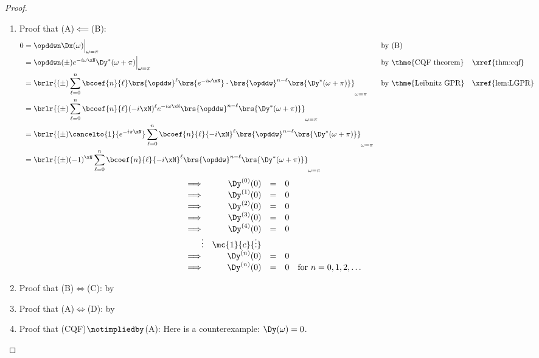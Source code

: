 \begin{proof}
\begin{enumerate}
  \item Proof that (A)$\impliedby$(B): 
    \begin{align*}
      0
        &= \opddwn\Dx(\omega)\Big|_{\omega=\pi}
        && \text{by (B)}
      \\&= \opddwn(\pm) e^{-i\omega\xN} \Dy^\ast(\omega+\pi)\Big|_{\omega=\pi}
        && \text{by \thme{CQF theorem}}
        && \text{\xref{thm:cqf}}
      \\&= \brlr{(\pm) \sum_{\ell=0}^n \bcoef{n}{\ell} \brs{\opddw}^\ell\brs{e^{-i\omega\xN}}\cdot\brs{\opddw}^{n-\ell}\brs{\Dy^\ast(\omega+\pi)}}_{\omega=\pi}
        && \text{by \thme{Leibnitz GPR}}
        && \text{\xref{lem:LGPR}}
      \\&= \brlr{(\pm) \sum_{\ell=0}^n \bcoef{n}{\ell} (-i\xN)^\ell e^{-i\omega\xN}\brs{\opddw}^{n-\ell}\brs{\Dy^\ast(\omega+\pi)}}_{\omega=\pi}
      \\&= \brlr{(\pm) \cancelto{1}{e^{-i\pi\xN}} \sum_{\ell=0}^n \bcoef{n}{\ell} {-i\xN}^\ell \brs{\opddw}^{n-\ell}\brs{\Dy^\ast(\omega+\pi)}}_{\omega=\pi}
      \\&= \brlr{(\pm) (-1)^\xN \sum_{\ell=0}^n \bcoef{n}{\ell} {-i\xN}^\ell \brs{\opddw}^{n-\ell}\brs{\Dy^\ast(\omega+\pi)}}_{\omega=\pi}
    \end{align*}
  \[\begin{array}{r rcl l}
    \implies & \Dy^{(0)}(0) &=& 0 \\
    \implies & \Dy^{(1)}(0) &=& 0 \\
    \implies & \Dy^{(2)}(0) &=& 0 \\
    \implies & \Dy^{(3)}(0) &=& 0 \\
    \implies & \Dy^{(4)}(0) &=& 0 \\
    \vdots   & \mc{1}{c}{\vdots}    \\
    \implies & \Dy^{(n)}(0) &=& 0 \\
    \implies & \Dy^{(n)}(0) &=& 0 & \text{for $n=0,1,2,\ldots$}
  \end{array}\]


  \item Proof that (B)$\iff$(C): by 
  \item Proof that (A)$\iff$(D): by 
  \item Proof that (CQF)$\notimpliedby$(A): Here is a counterexample: $\Dy(\omega)=0$.

\end{enumerate}
\end{proof}


